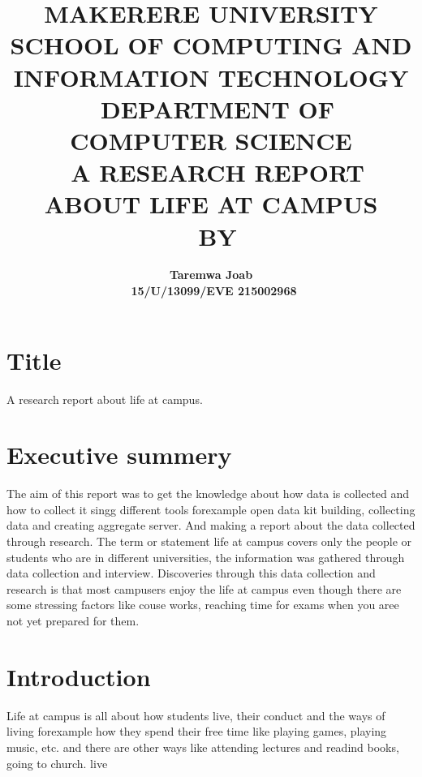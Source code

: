 \documentclass[a4paper,12pt]{report}
\begin{document}
 
\title{\textbf{MAKERERE UNIVERSITY}\vspace{12pt} \\\large  \textbf{SCHOOL OF COMPUTING AND INFORMATION TECHNOLOGY} \\\  \textbf{DEPARTMENT OF COMPUTER SCIENCE}\vspace{12pt}\\\  \textbf{A RESEARCH REPORT ABOUT LIFE AT CAMPUS}\vspace{12pt}\\\ \textbf{BY}}

\author {\textbf{Taremwa Joab}\\\ \textbf{15/U/13099/EVE 215002968}}

\maketitle


\renewcommand{\thechapter}{\Roman{chapter}} 
\section {{\LARGE  Title}}
A research report about life at campus.
 
\section{{\LARGE Executive summery}}
The aim of this report was to get the knowledge about how data is collected and how to collect it singg different tools forexample open data kit building, collecting data and creating aggregate server. And making a report about the data collected through research. The term or statement life at campus covers only the people or students who are in different universities, the information was gathered through data collection and interview. Discoveries through this data collection and research is that most campusers enjoy the life at campus even though there are some stressing factors like couse works, reaching time for exams when you aree not yet prepared for them.
 
 \section{{\LARGE Introduction}}
Life at campus is all about how students live, their conduct and the ways of living forexample how they spend their free time like playing games, playing music, etc. and there are other ways like attending lectures and readind books, going to church. live
\end{document}

